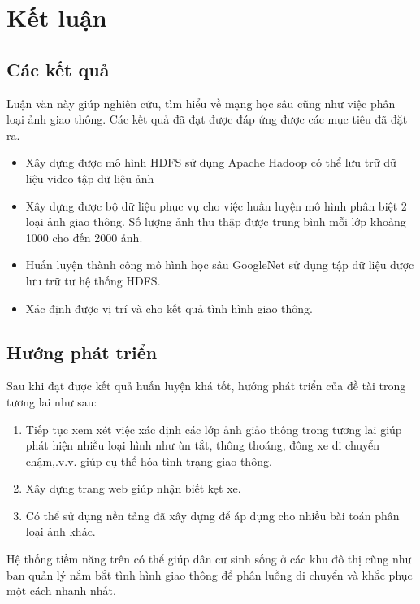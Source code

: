 \chapter{Kết luận}

\section{Các kết quả }
Luận văn này giúp nghiên cứu, tìm hiểu về mạng học sâu cũng như việc phân loại ảnh giao thông. Các kết quả đã đạt được đáp ứng được các mục tiêu đã đặt ra.
	\begin{itemize}
		\item Xây dựng được mô hình HDFS sử dụng Apache Hadoop có thể lưu trữ dữ liệu video tập dữ liệu ảnh
		\item Xây dựng được bộ dữ liệu phục vụ cho việc huấn luyện mô hình phân biệt 2 loại ảnh giao thông. Số lượng ảnh thu thập được trung bình mỗi lớp khoảng 1000 cho đến 2000 ảnh.
		\item Huấn luyện thành công mô hình học sâu GoogleNet sử dụng tập dữ liệu được lưu trữ tư hệ thống HDFS.
		\item Xác định được vị trí và cho kết quả tình hình giao thông.	
	\end{itemize}
\section{Hướng phát triển}
Sau khi đạt được kết quả huấn luyện khá tốt, hướng phát triển của đề tài trong tương lai như sau:
\begin{enumerate}
	\item Tiếp tục xem xét việc xác định các lớp ảnh giảo thông trong tương lai giúp phát hiện nhiều loại hình như ùn tắt, thông thoáng, đông xe di chuyển chậm,.v.v. giúp cụ thể hóa tình trạng giao thông.
	\item Xây dựng trang web giúp nhận biết kẹt xe.
	\item Có thể sử dụng nền tảng đã xây dựng để áp dụng cho nhiều bài toán phân loại ảnh khác.
\end{enumerate}
	

Hệ thống tiềm năng trên có thể giúp dân cư sinh sống ở các khu đô thị cũng như ban quản lý nắm bắt tình hình giao thông để phân luồng di chuyển và khắc phục một cách nhanh nhất.